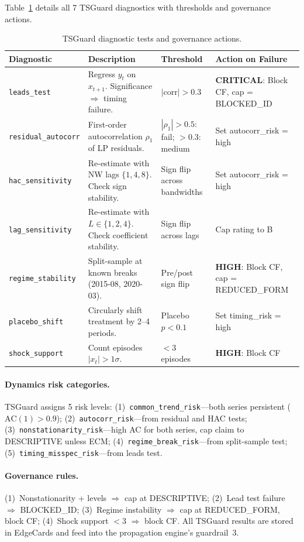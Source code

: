 \documentclass{article}
\begin{document}
Table~\ref{tab:tsguard-full} details all 7 TSGuard diagnostics with thresholds and governance actions.

\begin{table}[htbp]
\centering
\caption{TSGuard diagnostic tests and governance actions.}
\label{tab:tsguard-full}
\scriptsize
\begin{tabular}{@{}lp{3.5cm}lp{3.5cm}@{}}
\toprule
\textbf{Diagnostic} & \textbf{Description} & \textbf{Threshold} & \textbf{Action on Failure} \\
\midrule
\texttt{leads\_test} & Regress $y_t$ on $x_{t+1}$. Significance $\Rightarrow$ timing failure. & $|\text{corr}| > 0.3$ & \textbf{CRITICAL}: Block CF, cap = BLOCKED\_ID \\
\texttt{residual\_autocorr} & First-order autocorrelation $\rho_1$ of LP residuals. & $|\rho_1| > 0.5$: fail; $> 0.3$: medium & Set autocorr\_risk = high \\
\texttt{hac\_sensitivity} & Re-estimate with NW lags $\{1,4,8\}$. Check sign stability. & Sign flip across bandwidths & Set autocorr\_risk = high \\
\texttt{lag\_sensitivity} & Re-estimate with $L \in \{1,2,4\}$. Check coefficient stability. & Sign flip across lags & Cap rating to B \\
\texttt{regime\_stability} & Split-sample at known breaks (2015-08, 2020-03). & Pre/post sign flip & \textbf{HIGH}: Block CF, cap = REDUCED\_FORM \\
\texttt{placebo\_shift} & Circularly shift treatment by 2--4 periods. & Placebo $p < 0.1$ & Set timing\_risk = high \\
\texttt{shock\_support} & Count episodes $|x_t| > 1\sigma$. & $< 3$ episodes & \textbf{HIGH}: Block CF \\
\bottomrule
\end{tabular}
\end{table}

\paragraph{Dynamics risk categories.} TSGuard assigns 5 risk levels: (1)~\texttt{common\_trend\_risk}---both series persistent ($\text{AC}(1) > 0.9$); (2)~\texttt{autocorr\_risk}---from residual and HAC tests; (3)~\texttt{nonstationarity\_risk}---high AC for both series, cap claim to DESCRIPTIVE unless ECM; (4)~\texttt{regime\_break\_risk}---from split-sample test; (5)~\texttt{timing\_misspec\_risk}---from leads test.

\paragraph{Governance rules.} (1)~Nonstationarity + levels $\Rightarrow$ cap at DESCRIPTIVE; (2)~Lead test failure $\Rightarrow$ BLOCKED\_ID; (3)~Regime instability $\Rightarrow$ cap at REDUCED\_FORM, block CF; (4)~Shock support $< 3$ $\Rightarrow$ block CF. All TSGuard results are stored in EdgeCards and feed into the propagation engine's guardrail~3.
\end{document}
